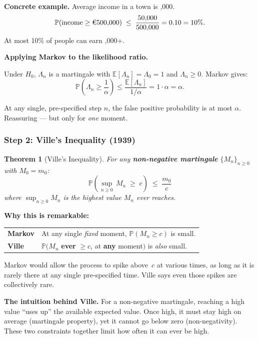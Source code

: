 \documentclass[12pt, a4paper]{article}
\newtheorem{theorem}{Theorem}
\newcommand{\E}{\mathbb{E}}            %
\newcommand{\Prob}{\mathbb{P}}         %
\newcommand{\LR}{\Lambda}              %
\begin{document}
\textbf{Concrete example.}
Average income in a town is ,000.
\[
  \Prob(\text{income} \geq \text{\texteuro}500{,}000)
  \;\leq\;
  \frac{50{,}000}{500{,}000} = 0.10 = 10\%.
\]
At most 10\% of people can earn ,000+.

\textbf{Applying Markov to the likelihood ratio.}

Under $H_0$, $\LR_n$ is a martingale with $\E[\LR_n] = \LR_0 = 1$ and
$\LR_n \geq 0$.  Markov gives:
\[
  \Prob\!\left(\LR_n \geq \frac{1}{\alpha}\right)
  \leq \frac{\E[\LR_n]}{1/\alpha}
  = 1 \cdot \alpha
  = \alpha.
\]

\begin{plainlanguage}
At any single, pre-specified step $n$, the false positive probability
is at most $\alpha$.  Reassuring --- but only for \emph{one} moment.
\end{plainlanguage}

\subsubsection*{Step 2: Ville's Inequality (1939)}

\begin{theorem}[Ville's Inequality]
For any \textbf{non-negative martingale} $\{M_n\}_{n \geq 0}$ with
$M_0 = m_0$:
\[
  \boxed{\Prob\!\left(\sup_{n \geq 0}\, M_n \;\geq\; c\right)
         \;\leq\; \frac{m_0}{c}}
\]
where $\sup_{n\geq 0} M_n$ is the highest value $M_n$ \emph{ever} reaches.
\end{theorem}

\textbf{Why this is remarkable:}

\begin{center}
\renewcommand{\arraystretch}{1.3}
\begin{tabular}{@{} l p{9cm} @{}}
\toprule
\textbf{Markov} & At any single \emph{fixed} moment, $\Prob(M_n \geq c)$ is small. \\
\textbf{Ville}  & $\Prob(M_n$ \textbf{ever} $\geq c$, at \textbf{any} moment$)$ is \emph{also} small. \\
\bottomrule
\end{tabular}
\end{center}

Markov would allow the process to spike above~$c$ at various times, as long as
it is rarely there at any single pre-specified time.  Ville says even those
spikes are collectively rare.

\textbf{The intuition behind Ville.}
For a non-negative martingale, reaching a high value ``uses up'' the available
expected value.  Once high, it must stay high on average (martingale property),
yet it cannot go below zero (non-negativity).  These two constraints together
limit how often it can ever be high.
\end{document}
